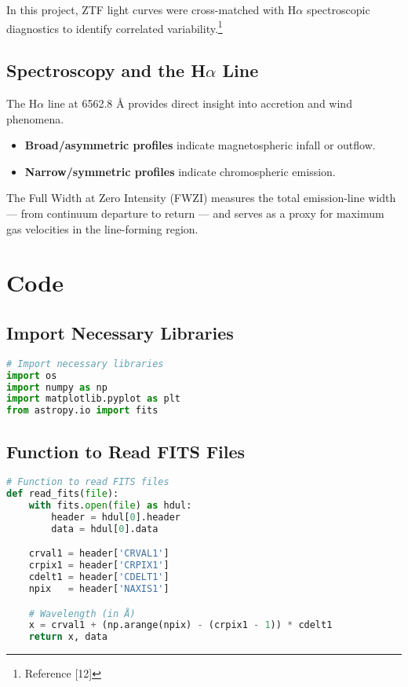 \documentclass{article}
\begin{document}
In this project, ZTF light curves were cross-matched with H$\alpha$ spectroscopic diagnostics to identify correlated variability.\footnote{Reference [12]}

\subsection{Spectroscopy and the H$\alpha$ Line}

The H$\alpha$ line at 6562.8 Å provides direct insight into accretion and wind phenomena.
\begin{itemize}
    \item \textbf{Broad/asymmetric profiles} indicate magnetospheric infall or outflow.
    \item \textbf{Narrow/symmetric profiles} indicate chromospheric emission.
\end{itemize}

The Full Width at Zero Intensity (FWZI) measures the total emission-line width — from continuum departure to return — and serves as a proxy for maximum gas velocities in the line-forming region.

\section{Code}

\subsection{Import Necessary Libraries}

\begin{lstlisting}[language=Python]
# Import necessary libraries
import os
import numpy as np
import matplotlib.pyplot as plt
from astropy.io import fits
\end{lstlisting}

\subsection{Function to Read FITS Files}

\begin{lstlisting}[language=Python]
# Function to read FITS files
def read_fits(file):
    with fits.open(file) as hdul:
        header = hdul[0].header
        data = hdul[0].data

    crval1 = header['CRVAL1']
    crpix1 = header['CRPIX1']
    cdelt1 = header['CDELT1']
    npix   = header['NAXIS1']

    # Wavelength (in Å)
    x = crval1 + (np.arange(npix) - (crpix1 - 1)) * cdelt1
    return x, data
\end{lstlisting}
\end{document}
